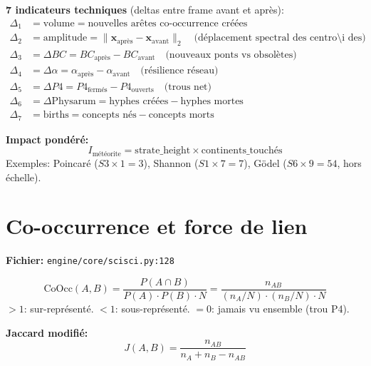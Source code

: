 \documentclass[11pt,a4paper]{article}
\begin{document}
\textbf{7 indicateurs techniques} (deltas entre frame avant et apr\`es):
\begin{align}
\Delta_1 &= \text{volume} = \text{nouvelles ar\^etes co-occurrence cr\'e\'ees} \\
\Delta_2 &= \text{amplitude} = \|\mathbf{x}_{\text{apr\`es}} - \mathbf{x}_{\text{avant}}\|_2
  \quad\text{(d\'eplacement spectral des centro\"\i des)} \\
\Delta_3 &= \Delta BC = BC_{\text{apr\`es}} - BC_{\text{avant}}
  \quad\text{(nouveaux ponts vs obsol\`etes)} \\
\Delta_4 &= \Delta\alpha = \alpha_{\text{apr\`es}} - \alpha_{\text{avant}}
  \quad\text{(r\'esilience r\'eseau)} \\
\Delta_5 &= \Delta P4 = P4_{\text{ferm\'es}} - P4_{\text{ouverts}}
  \quad\text{(trous net)} \\
\Delta_6 &= \Delta\text{Physarum} = \text{hyphes cr\'e\'ees} - \text{hyphes mortes} \\
\Delta_7 &= \text{births} = \text{concepts n\'es} - \text{concepts morts}
\end{align}

\textbf{Impact pond\'er\'e:}
\begin{equation}
I_{\text{m\'et\'eorite}} = \text{strate\_height} \times \text{continents\_touch\'es}
\end{equation}
Exemples: Poincar\'e ($S3 \times 1 = 3$), Shannon ($S1 \times 7 = 7$),
G\"odel ($S6 \times 9 = 54$, hors \'echelle).

\section{Co-occurrence et force de lien}

\textbf{Fichier:} \texttt{engine/core/scisci.py:128}

\begin{equation}
\text{CoOcc}(A,B) = \frac{P(A \cap B)}{P(A) \cdot P(B) \cdot N}
= \frac{n_{AB}}{(n_A / N) \cdot (n_B / N) \cdot N}
\end{equation}
$> 1$: sur-repr\'esent\'e. $< 1$: sous-repr\'esent\'e. $= 0$: jamais vu ensemble (trou P4).

\textbf{Jaccard modifi\'e:}
\begin{equation}
J(A,B) = \frac{n_{AB}}{n_A + n_B - n_{AB}}
\end{equation}
\end{document}
